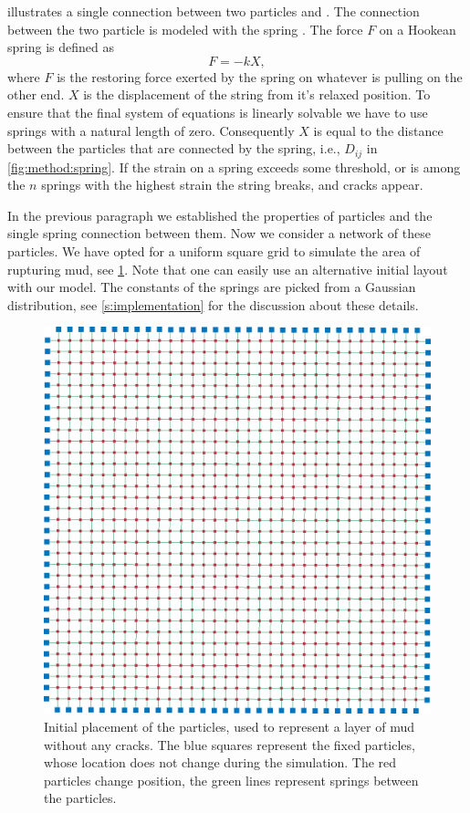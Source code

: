  illustrates a single connection between two particles  and . The connection between the two particle is modeled with the spring . The force $F$ on a Hookean spring is defined as
%
\begin{equation}\label{eq:method:hookeslaw}
	F = -k X,	
\end{equation}
%
where $F$ is the restoring force exerted by the spring on whatever is pulling on the other end. $X$ is the displacement of the string from it's relaxed position. To ensure that the final system of equations is linearly solvable we have to use springs with a natural length of zero. Consequently $X$ is equal to the distance between the particles that are connected by the spring, i.e., $D_{ij}$ in \cref{fig:method:spring}. If the strain on a spring exceeds some threshold, or is among the $n$ springs with the highest strain the string breaks, and cracks appear.

In the previous paragraph we established the properties of particles and the single spring connection between them. Now we consider a network of these particles. We have opted for a uniform square grid to simulate the area of rupturing mud, see \cref{fig:model:layout}. Note that one can easily use an alternative initial layout with our model. The constants of the springs are picked from a Gaussian distribution, see \cref{s:implementation} for the discussion about these details.
%
\begin{figure}
	\centering
	\includegraphics[width=0.9\columnwidth]{img/uniform_square_grid.png}
	\caption{Initial placement of the particles, used to represent a layer of mud without any cracks. The blue squares represent the fixed particles, whose location does not change during the simulation. The red particles change position, the green lines represent springs between the particles.}
	\label{fig:model:layout}
\end{figure}


